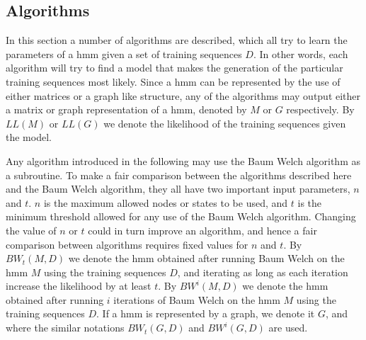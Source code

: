\subsection{Algorithms}
In this section a number of algorithms are described, which all try to learn the parameters of a \gls{hmm} given a set of training sequences $D$.
In other words, each algorithm will try to find a model that makes the generation of the particular training sequences most likely.
Since a \gls{hmm} can be represented by the use of either matrices or a graph like structure, any of the algorithms may output either a matrix or graph representation of a \gls{hmm}, denoted by $M$ or $G$ respectively.
By $LL(M)$ or $LL(G)$ we denote the likelihood of the training sequences given the model.

Any algorithm introduced in the following may use the Baum Welch algorithm as a subroutine. 
To make a fair comparison between the algorithms described here and the Baum Welch algorithm, they all have two important input parameters, $n$ and $t$.
$n$ is the maximum allowed nodes or states to be used, and $t$ is the minimum threshold allowed for any use of the Baum Welch algorithm.
Changing the value of $n$ or $t$ could in turn improve an algorithm, and hence a fair comparison between algorithms requires fixed values for $n$ and $t$.
By $BW_t(M, D)$ we denote the \gls{hmm} obtained after running Baum Welch on the \gls{hmm} $M$ using the training sequences $D$, and iterating as long as each iteration increase the likelihood by at least $t$.
By $BW^i(M, D)$ we denote the \gls{hmm} obtained after running $i$ iterations of Baum Welch on the \gls{hmm} $M$ using the training sequences $D$.
If a \gls{hmm} is represented by a graph, we denote it $G$, and where the similar notations $BW_t(G, D)$ and $BW^i(G, D)$ are used.



